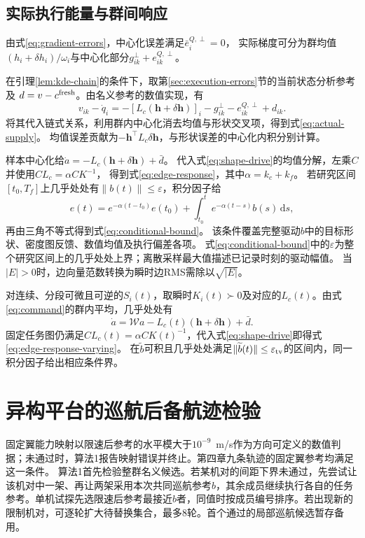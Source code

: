 \documentclass[UTF8,a4paper,11pt,fontset=none]{ctexart}
\begin{document}
\subsection{实际执行能量与群间响应}
由式\eqref{eq:gradient-errors}，中心化误差满足$\bar e_i^{Q,\perp}=0$，
实际梯度可分为群均值$(h_i+\delta h_i)/\omega_i$与中心化部分$g_{ik}^{\perp}+e_{ik}^{Q,\perp}$。

在引理\ref{lem:kde-chain}的条件下，取第\ref{sec:execution-errors}节的当前状态分析参考及
$d=v-c^{\rm fresh}$。由名义参考的数值实现，有
\[
v_{ik}-\dot q_i
=-[L_c(\mathbf h+\delta\mathbf h)]_i-g^\perp_{ik}-e^{Q,\perp}_{ik}+d_{ik} .
\]
将其代入链式关系，利用群内中心化消去均值与形状交叉项，得到式\eqref{eq:actual-supply}。
均值误差贡献为$-\mathbf h^\top L_c\delta\mathbf h$，与形状误差的中心化内积分别计算。

样本中心化给$\dot a=-L_c(\mathbf h+\delta\mathbf h)+\bar d$。
代入式\eqref{eq:shape-drive}的均值分解，左乘$C$并使用$CL_c=\alpha CK^{-1}$，
得到式\eqref{eq:edge-response}，其中$\alpha=k_c+k_f$。
若研究区间$[t_0,T_f]$上几乎处处有$\|b(t)\|\le\varepsilon$，积分因子给
\[
e(t)=e^{-\alpha(t-t_0)}e(t_0)+\int_{t_0}^t e^{-\alpha(t-s)}b(s)\,\mathrm ds,
\]
再由三角不等式得到式\eqref{eq:conditional-bound}。
该条件覆盖完整驱动$b$中的目标形状、密度图反馈、数值均值及执行偏差各项。
式\eqref{eq:conditional-bound}中的$\varepsilon$为整个研究区间上的几乎处处上界；离散采样最大值描述已记录时刻的驱动幅值。
当$|E|>0$时，边向量范数转换为瞬时边RMS需除以$\sqrt{|E|}$。

对连续、分段可微且可逆的$S_i(t)$，取瞬时$K_i(t)\succ0$及对应的$L_c(t)$。由式\eqref{eq:command}的群内平均，几乎处处有
\[
\dot a=\mathcal W a-L_c(t)(\mathbf h+\delta\mathbf h)+\bar d.
\]
固定任务图仍满足$CL_c(t)=\alpha CK(t)^{-1}$，代入式\eqref{eq:shape-drive}即得式\eqref{eq:edge-response-varying}。
在$\widetilde b$可积且几乎处处满足$\|\widetilde b(t)\|\le\varepsilon_{\rm tv}$的区间内，同一积分因子给出相应条件界。

\section{异构平台的巡航后备航迹检验}\label{app:braking}
固定翼能力映射以限速后参考的水平模大于$10^{-9}$~m/s作为方向可定义的数值判据；未通过时，算法1报告映射错误并终止。第四章九条轨迹的固定翼参考均满足这一条件。
算法1首先检验整群名义候选。若某机对的间距下界未通过，先尝试让该机对中一架、再让两架采用本次共同巡航参考$b$，其余成员继续执行各自的任务参考。单机试探先选限速后参考最接近$b$者，同值时按成员编号排序。若出现新的限制机对，可逐轮扩大待替换集合，最多8轮。首个通过的局部巡航候选暂存备用。
\end{document}
